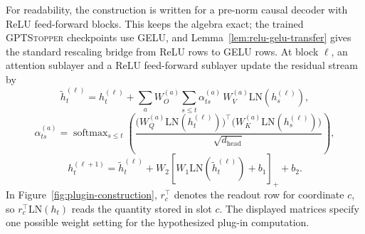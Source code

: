 \documentclass[11pt]{article}
\begin{document}
For readability, the construction is written for a pre-norm causal decoder with ReLU feed-forward blocks. This keeps the algebra exact; the trained \textsc{GPTStopper} checkpoints use GELU, and Lemma~\ref{lem:relu-gelu-transfer} gives the standard rescaling bridge from ReLU rows to GELU rows. At block \(\ell\), an attention sublayer and a ReLU feed-forward sublayer update the residual stream by
\[
\widetilde h_t^{(\ell)}
=h_t^{(\ell)}
+\sum_a W_O^{(a)}
\sum_{s\le t}
\alpha_{ts}^{(a)}\,W_V^{(a)}\mathrm{LN}(h_s^{(\ell)}),
\]
\[
\alpha_{ts}^{(a)}
=
\operatorname{softmax}_{s\le t}
\left(
\frac{
\bigl(W_Q^{(a)}\mathrm{LN}(h_t^{(\ell)})\bigr)^\top
\bigl(W_K^{(a)}\mathrm{LN}(h_s^{(\ell)})\bigr)}
{\sqrt{d_{\mathrm{head}}}}
\right),
\]
\[
h_t^{(\ell+1)}
=
\widetilde h_t^{(\ell)}
+W_2\!\left[W_1\mathrm{LN}(\widetilde h_t^{(\ell)})+b_1\right]_+ + b_2 .
\]
In Figure~\ref{fig:plugin-construction}, \(r_c^\top\) denotes the readout row for coordinate \(c\), so \(r_c^\top\mathrm{LN}(h_t)\) reads the quantity stored in slot \(c\). The displayed matrices specify one possible weight setting for the hypothesized plug-in computation.
\end{document}
